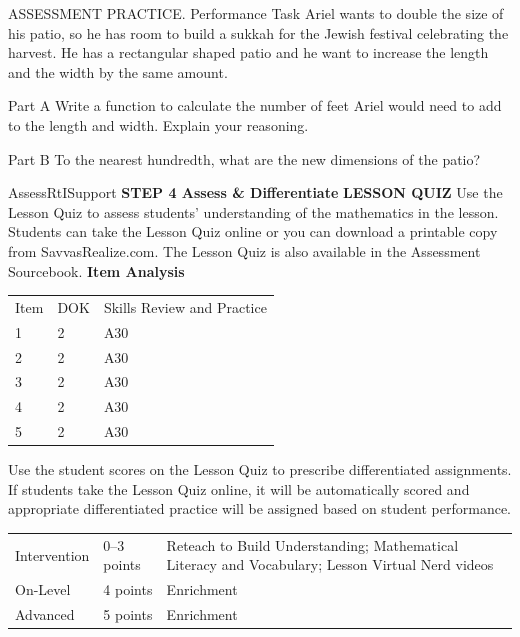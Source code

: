 \documentclass{article}
\newenvironment{practice}[2]{}{}        %
\newenvironment{te-addendum}[2]{}{}     %
\newcommand{\answer}[1]{}               %
\newcommand{\placeholder}[2]{}          %
\begin{document}
\begin{practice}{54}{3}
ASSESSMENT PRACTICE. Performance Task Ariel wants to double the size of his patio, so he has room to build a sukkah for the Jewish festival celebrating the harvest. He has a rectangular shaped patio and he want to increase the length and the width by the same amount.
\placeholder{illustration}{Top view of a rectangular brick patio with a round table, four chairs, two large shrubs and smaller potted plants. Red double-ended dimension arrows label bottom 14 ft and right side 10 ft.}
Part A Write a function to calculate the number of feet Ariel would need to add to the length and width. Explain your reasoning.
\answer{(x^2+24x+140=280); Let x represent the number of feet to add to the length and width. The new dimensions and the new area can be represented as ((14+x)(10+x)=2(10)(14)). Expand to determine the function.}
Part B To the nearest hundredth, what are the new dimensions of the patio?
\answer{18.85 ft by 14.85 ft}
\end{practice}
\begin{te-addendum}{Assess}{RtISupport}
\textbf{STEP 4 Assess \& Differentiate}
\textbf{LESSON QUIZ}
Use the Lesson Quiz to assess students' understanding of the mathematics in the lesson.
Students can take the Lesson Quiz online or you can download a printable copy from SavvasRealize.com. The Lesson Quiz is also available in the Assessment Sourcebook.
\textbf{Item Analysis}
\begin{tabular}{lll}
Item & DOK & Skills Review and Practice \\
1 & 2 & A30 \\
2 & 2 & A30 \\
3 & 2 & A30 \\
4 & 2 & A30 \\
5 & 2 & A30 \\
\end{tabular}
Use the student scores on the Lesson Quiz to prescribe differentiated assignments.
If students take the Lesson Quiz online, it will be automatically scored and appropriate differentiated practice will be assigned based on student performance.
\begin{tabular}{lll}
Intervention & 0--3 points & Reteach to Build Understanding; Mathematical Literacy and Vocabulary; Lesson Virtual Nerd videos \\
On-Level & 4 points & Enrichment \\
Advanced & 5 points & Enrichment \\
\end{tabular}
\end{te-addendum}
\end{document}
